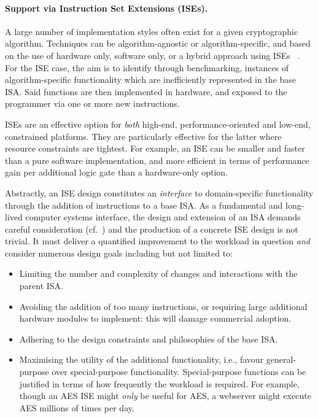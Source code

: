 
\paragraph{Support via Instruction Set Extensions (ISEs).}

A large number of implementation styles often exist
for a given cryptographic algorithm.
Techniques can be
   algorithm-agnostic
   or
   algorithm-specific,
and based on the use of   
   hardware              only,
                software only,
   or
   a hybrid approach using ISEs ~\cite{GalBer:11,BarGioMar:09,RegIen:16}.
For the ISE case, the aim is to identify through benchmarking, instances of
algorithm-specific functionality which are inefficiently represented in the
base ISA.
Said functions are then implemented in hardware, and exposed to the
programmer via one or more new instructions.

ISEs are an effective option for {\em both}
high-end, performance-oriented
and
 low-end, constrained
platforms. 
They are particularly effective for the latter where resource constraints
are tightest.
For example,
an ISE can be smaller and faster than a pure software implementation,
and more efficient in terms of performance gain per additional logic gate
than a hardware-only option.

Abstractly, an ISE design constitutes
an {\em interface} to domain-specific functionality through the
addition of instructions to a base ISA.
As a fundamental and long-lived computer systems interface, the design
and extension of an ISA demands careful consideration
(cf.~\cite[Section 4]{Gueron:09})
and the production of a concrete ISE design is not trivial.
It must deliver a quantified improvement to the workload in 
question {\em and}
consider numerous design goals including but not limited to:

\begin{itemize}
\item Limiting the number and complexity of changes and interactions with the
    parent ISA.
\item Avoiding the addition of too many instructions, or requiring large
    additional hardware modules to implement: this will damage commercial
    adoption.
\item Adhering to the design constraints and philosophies of the base ISA.
\item Maximising the utility of the additional functionality,
      i.e.,
      favour general-purpose over special-purpose functionality.
      Special-purpose functions can be justified in terms of how frequently
      the workload is required.
      For example, though an AES ISE might {\em only}
      be useful for AES, a webserver might execute AES millions of times
      per day.
\end{itemize}

